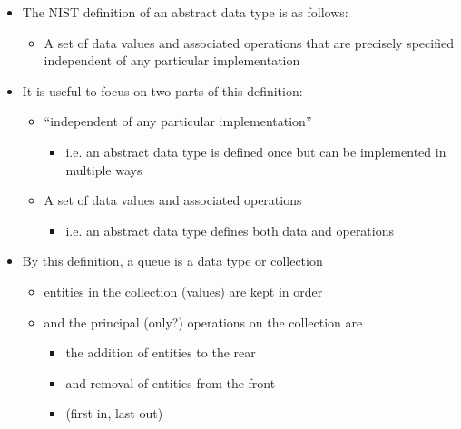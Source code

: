 \documentclass{beamer}
\begin{document}
\begin{frame}\begin{itemize}
\item The NIST definition of an abstract data type is as follows:

\begin{itemize}
\item A set of data values and associated operations that are precisely
specified independent of any particular implementation
\end{itemize}
\end{itemize}\end{frame}\begin{frame}\begin{itemize}
\item It is useful to focus on two parts of this definition: 

\begin{itemize}
\item ``independent of any particular implementation'' 

\begin{itemize}
\item i.e. an abstract data type is defined once but can be implemented
in multiple ways
\end{itemize}
\item A set of data values and associated operations

\begin{itemize}
\item i.e. an abstract data type defines both data and operations
\end{itemize}
\end{itemize}
\end{itemize}\end{frame}

\begin{frame}\begin{itemize}
\item By this definition, a queue is a data type or collection 

\begin{itemize}
\item entities in the collection (values) are kept in order
\item and the principal (only?) operations on the collection are 

\begin{itemize}
\item the addition of entities to the rear
\item and removal of entities from the front 
\item (first in, last out)
\end{itemize}
\end{itemize}
\end{itemize}\end{frame}
\end{document}
